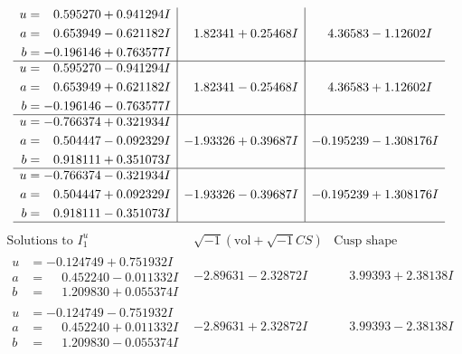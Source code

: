 \documentclass[1p]{elsarticle_modified}
\theoremstyle{definition}
\newcommand{\I}{\sqrt{-1}}
\begin{document}
$$\begin{array}{c|c|c}
\begin{aligned}
u &= \phantom{-}0.595270 + 0.941294 I \\
a &= \phantom{-}0.653949 - 0.621182 I \\
b &= -0.196146 + 0.763577 I\end{aligned}
 & \phantom{-}1.82341 + 0.25468 I & \phantom{-}4.36583 - 1.12602 I \\ \hline\begin{aligned}
u &= \phantom{-}0.595270 - 0.941294 I \\
a &= \phantom{-}0.653949 + 0.621182 I \\
b &= -0.196146 - 0.763577 I\end{aligned}
 & \phantom{-}1.82341 - 0.25468 I & \phantom{-}4.36583 + 1.12602 I \\ \hline\begin{aligned}
u &= -0.766374 + 0.321934 I \\
a &= \phantom{-}0.504447 - 0.092329 I \\
b &= \phantom{-}0.918111 + 0.351073 I\end{aligned}
 & -1.93326 + 0.39687 I & -0.195239 - 1.308176 I \\ \hline\begin{aligned}
u &= -0.766374 - 0.321934 I \\
a &= \phantom{-}0.504447 + 0.092329 I \\
b &= \phantom{-}0.918111 - 0.351073 I\end{aligned}
 & -1.93326 - 0.39687 I & -0.195239 + 1.308176 I\\
 \hline 
 \end{array}$$\newpage$$\begin{array}{c|c|c}  
\text{Solutions to }I^u_{1}& \I (\text{vol} + \sqrt{-1}CS) & \text{Cusp shape}\\
 \hline 
\begin{aligned}
u &= -0.124749 + 0.751932 I \\
a &= \phantom{-}0.452240 - 0.011332 I \\
b &= \phantom{-}1.209830 + 0.055374 I\end{aligned}
 & -2.89631 - 2.32872 I & \phantom{-}3.99393 + 2.38138 I \\ \hline\begin{aligned}
u &= -0.124749 - 0.751932 I \\
a &= \phantom{-}0.452240 + 0.011332 I \\
b &= \phantom{-}1.209830 - 0.055374 I\end{aligned}
 & -2.89631 + 2.32872 I & \phantom{-}3.99393 - 2.38138 I \\ \hline\begin{aligned}

\end{aligned}
\end{array}$$
\end{document}
